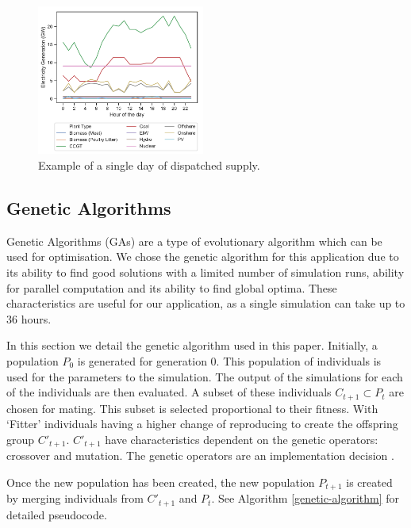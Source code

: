 \begin{figure}
	\centering
	\includegraphics[width=0.49\textwidth]{Chapter4/figures/e-Energy-2020/methods_and_materials/clusters_results_single_day.pdf}
	\caption{Example of a single day of dispatched supply.}
	\label{fig:single_dispatched_day}
\end{figure}





\subsection{Genetic Algorithms}

Genetic Algorithms (GAs) are a type of evolutionary algorithm which can be used for optimisation. We chose the genetic algorithm for this application due to its ability to find good solutions with a limited number of simulation runs, ability for parallel computation and its ability to find global optima. These characteristics are useful for our application, as a single simulation can take up to 36 hours. 

In this section we detail the genetic algorithm used in this paper. Initially, a population $P_{0}$ is generated for generation 0. This population of individuals is used for the parameters to the simulation. The output of the simulations for each of the individuals are then evaluated. A subset of these individuals $C_{t+1} \subset P_{t}$ are chosen for mating. This subset is selected proportional to their fitness. With `Fitter' individuals having a higher change of reproducing to create the offspring group $C'_{t+1}$. $C'_{t+1}$ have characteristics dependent on the genetic operators: crossover and mutation. The genetic operators are an implementation decision \cite{FogelDavidB2009}. 

Once the new population has been created, the new population $P_{t+1}$ is created by merging individuals from $C'_{t+1}$ and $P_{t}$. See Algorithm \ref{genetic-algorithm} for detailed pseudocode.

